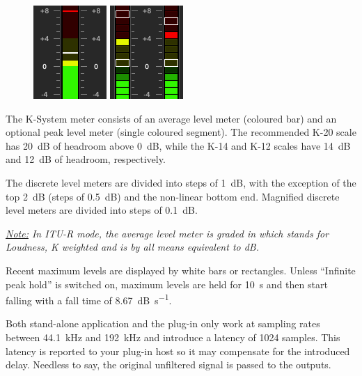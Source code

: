 \begin{figure}
\includegraphics[scale=0.58,clip]{include/images/level_meter_itu_continuous.png}
\newline \vspace{-0.55\baselineskip}
\includegraphics[scale=0.58,clip]{include/images/level_meter_rms_discrete.png}
\end{figure}

The K-System meter consists of an average level meter (coloured bar)
and an optional peak level meter (single coloured segment).  The
recommended K-20 scale has \SI{20}{\dB} of headroom above \SI{0}{\dB},
while the K-14 and K-12 scales have \SI{14}{\dB} and \SI{12}{\dB} of
headroom, respectively.

The discrete level meters are divided into steps of \SI{1}{\dB}, with
the exception of the top \SI{2}{\dB} (steps of \SI{0.5}{\dB}) and the
non-linear bottom end.  Magnified discrete level meters are divided
into steps of \SI{0.1}{\dB}.

\emph{\underline{Note:} In ITU-R mode, the average level meter is
  graded in \emph{\si{\LK}} which stands for \emph{Loudness, K
    weighted} and is by all means equivalent to \si{\dB}.}

Recent maximum levels are displayed by white bars or rectangles.
Unless ``Infinite peak hold'' is switched on, maximum levels are held
for \SI{10}{\second} and then start falling with a fall time of
\SI{8.67}{\dB\per\second}.

Both stand-alone application and the plug-in only work at sampling
rates between \SI{44.1}{\kilo\hertz} and \SI{192}{\kilo\hertz} and
introduce a latency of \num{1024} samples.  This latency is reported
to your plug-in host so it may compensate for the introduced delay.
Needless to say, the original unfiltered signal is passed to the
outputs.

